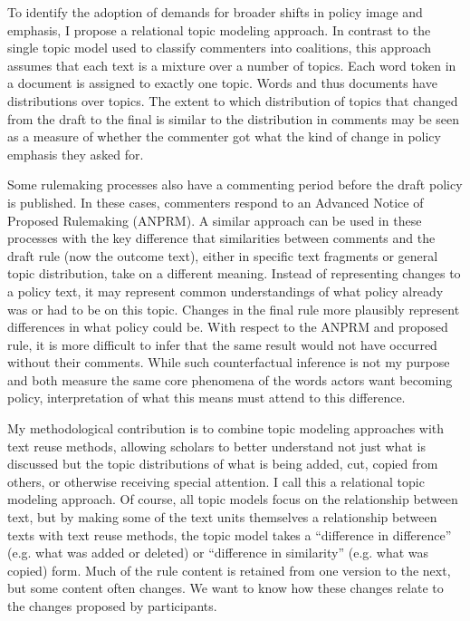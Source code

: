 To identify the adoption of demands for broader shifts in policy image and emphasis, I propose a relational topic modeling approach. In contrast to the single topic model used to classify commenters into coalitions, this approach assumes that each text is a mixture over a number of topics. Each word token in a document is assigned to exactly one topic. Words and thus documents have distributions over topics. The extent to which distribution of topics that changed from the draft to the final is similar to the distribution in comments may be seen as a measure of whether the commenter got what the kind of change in policy emphasis they asked for. 

Some rulemaking processes also have a commenting period before the draft policy is published. In these cases, commenters respond to an Advanced Notice of Proposed Rulemaking (ANPRM). A similar approach can be used in these processes with the key difference that similarities between comments and the draft rule (now the outcome text), either in specific text fragments or general topic distribution, take on a different meaning. Instead of representing changes to a policy text, it may represent common understandings of what policy already was or had to be on this topic. Changes in the final rule more plausibly represent differences in what policy could be. With respect to the ANPRM and proposed rule, it is more difficult to infer that the same result would not have occurred without their comments. While such counterfactual inference is not my purpose and both measure the same core phenomena of the words actors want becoming policy, interpretation of what this means must attend to this difference. 


My methodological contribution is to combine topic modeling approaches with text reuse methods, allowing scholars to better understand not just what is discussed but the topic distributions of what is being added, cut, copied from others, or otherwise receiving special attention. I call this a relational topic modeling approach. Of course, all topic models focus on the relationship between text, but by making some of the text units themselves a relationship between texts with text reuse methods, the topic model takes a ``difference in difference'' (e.g. what was added or deleted) or ``difference in similarity'' (e.g. what was copied) form. Much of the rule content is retained from one version to the next, but some content often changes. We want to know how these changes relate to the changes proposed by participants. 

